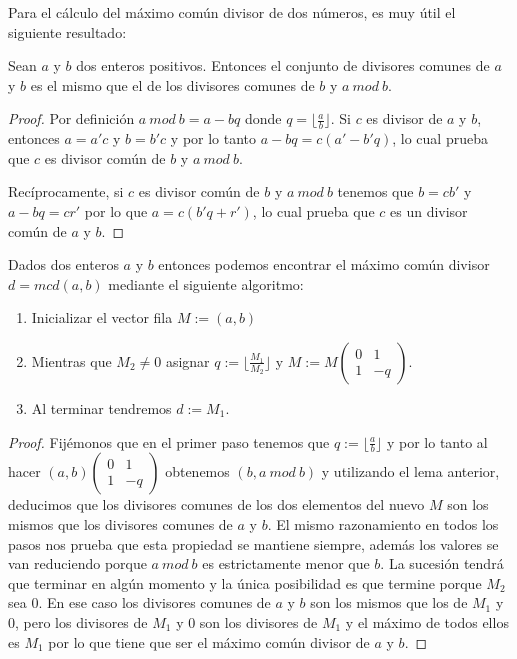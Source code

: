 Para el c\'alculo del m\'aximo com\'un divisor de dos n\'umeros, es muy \'util el
siguiente resultado:

\begin{lemma}
Sean $a$ y $b$ dos enteros positivos. Entonces el conjunto de divisores comunes de
$a$ y $b$ es el mismo que el de los divisores comunes de $b$ y $a~mod~b$.
\end{lemma}
\begin{proof}
Por definici\'on $a~mod~b = a-bq$ donde $q = \lfloor \frac{a}{b} \rfloor$. Si $c$
es divisor de $a$ y $b$, entonces $a = a'c$ y $b = b'c$ y por lo tanto $a-bq = c(a'-b'q)$,
lo cual prueba que $c$ es divisor com\'un de $b$ y $a~mod~b$.

Rec\'iprocamente, si $c$ es divisor com\'un de $b$ y $a~mod~b$ tenemos que $b = cb'$
y $a-bq = cr'$ por lo que $a = c(b'q+r')$, lo cual prueba que $c$ es un divisor
com\'un de $a$ y $b$.
\end{proof}

\begin{algorithm}
Dados dos enteros $a$ y $b$ entonces podemos encontrar el m\'aximo com\'un divisor
$d = mcd(a,b)$ mediante el siguiente algoritmo:
\begin{enumerate}
\item Inicializar el vector fila $M :=  (a,b)$
\item Mientras que $M_{2} \not= 0$ asignar $q := \lfloor \frac{M_{1}}{M_{2}} \rfloor$
y $M := M \left( \begin{array}{cc} 0 & 1 \\ 1 & -q
\end{array}  \right)$.
\item Al terminar tendremos $d := M_{1}$.
\end{enumerate}
\end{algorithm}
\begin{proof}
Fij\'emonos que en el primer paso tenemos que $q := \lfloor \frac{a}{b} \rfloor$ y por lo tanto al hacer
$ (a,b) \left( \begin{array}{cc} 0 & 1 \\ 1 & -q
\end{array}  \right)$ obtenemos $(b,a~mod~b)$ y utilizando el lema anterior, deducimos que los divisores comunes de los
dos elementos del nuevo $M$ son los mismos que los divisores comunes de $a$ y $b$. El mismo razonamiento en todos los pasos nos prueba que esta propiedad se
mantiene siempre, adem\'as los valores se van reduciendo porque $a~mod~b$ es estrictamente menor que $b$. La sucesi\'on tendr\'a que terminar en alg\'un momento
y la \'unica posibilidad es que termine porque $M_{2}$ sea $0$. En ese caso los divisores comunes de $a$ y $b$ son los mismos que los de $M_{1}$ y $0$, pero los
divisores de $M_{1}$ y $0$ son los divisores de $M_{1}$ y el m\'aximo de todos ellos es $M_{1}$ por lo que tiene que ser el m\'aximo com\'un divisor de $a$ y $b$.
\end{proof}


